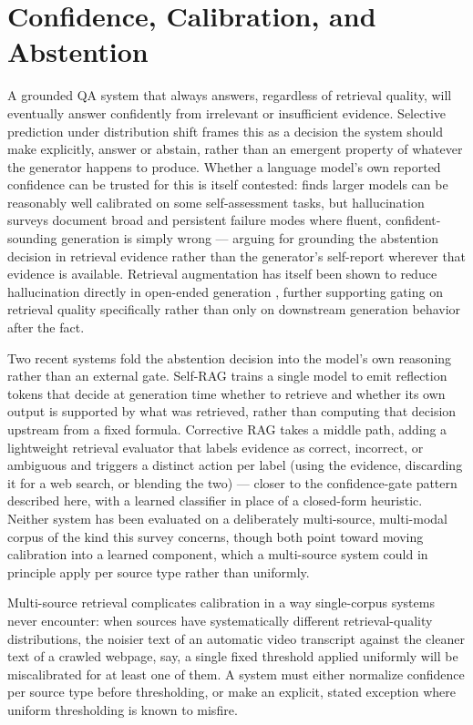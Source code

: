 \documentclass[conference]{IEEEtran}
\begin{document}
\section{Confidence, Calibration, and Abstention}
\label{sec:confidence}

A grounded QA system that always answers, regardless of retrieval quality, will eventually answer confidently from irrelevant or insufficient evidence. Selective prediction under distribution shift \cite{kamath2020selective} frames this as a decision the system should make explicitly, answer or abstain, rather than an emergent property of whatever the generator happens to produce. Whether a language model's own reported confidence can be trusted for this is itself contested: \cite{kadavath2022knowwhattheyknow} finds larger models can be reasonably well calibrated on some self-assessment tasks, but hallucination surveys \cite{ji2023hallucination} document broad and persistent failure modes where fluent, confident-sounding generation is simply wrong — arguing for grounding the abstention decision in retrieval evidence rather than the generator's self-report wherever that evidence is available. Retrieval augmentation has itself been shown to reduce hallucination directly in open-ended generation \cite{shuster2021retrieval}, further supporting gating on retrieval quality specifically rather than only on downstream generation behavior after the fact.

Two recent systems fold the abstention decision into the model's own reasoning rather than an external gate. Self-RAG \cite{asai2024selfrag} trains a single model to emit reflection tokens that decide at generation time whether to retrieve and whether its own output is supported by what was retrieved, rather than computing that decision upstream from a fixed formula. Corrective RAG \cite{yan2024crag} takes a middle path, adding a lightweight retrieval evaluator that labels evidence as correct, incorrect, or ambiguous and triggers a distinct action per label (using the evidence, discarding it for a web search, or blending the two) — closer to the confidence-gate pattern described here, with a learned classifier in place of a closed-form heuristic. Neither system has been evaluated on a deliberately multi-source, multi-modal corpus of the kind this survey concerns, though both point toward moving calibration into a learned component, which a multi-source system could in principle apply per source type rather than uniformly.

Multi-source retrieval complicates calibration in a way single-corpus systems never encounter: when sources have systematically different retrieval-quality distributions, the noisier text of an automatic video transcript against the cleaner text of a crawled webpage, say, a single fixed threshold applied uniformly will be miscalibrated for at least one of them. A system must either normalize confidence per source type before thresholding, or make an explicit, stated exception where uniform thresholding is known to misfire.
\end{document}
